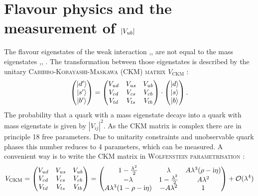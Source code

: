 \section{Flavour physics and the measurement of $|{V_{{u}{b}}}|$}
The flavour eigenstates of the weak interaction ,,   are not equal to the mass eigenstates \ket{\dquark},\ket{\squark},  \ket{\bquark}.
The transformation between those eigenstates is described by the unitary \textsc{Cabibbo-Kobayashi-Maskawa (CKM) matrix} $V_\text{CKM}$ \cite{Kobayashi_CKM}:
\begin{align}
\begin{pmatrix}
|d'\rangle \\ |s'\rangle \\ |b'\rangle
\end{pmatrix}
=
\begin{pmatrix}
V_{ud} & V_{us} & V_{ub} \\
V_{cd} & V_{cs} & V_{cb} \\
V_{td} & V_{ts} & V_{tb} \\
\end{pmatrix}
\cdot
\begin{pmatrix}
|d\rangle \\ |s\rangle \\ |b\rangle
\end{pmatrix}.
\end{align}
The probability that a quark with a mass eigenstate  decays into a quark with mass eigenstate  is given by $|V_{ij}|^2$.
As the CKM matrix is complex there are in principle 18 free parameters.
Due to unitarity constraints and unobservable quark phases this number reduces to 4 parameters, which can be measured.
A convenient way is to write the CKM matrix in \textsc{Wolfenstein parametrisation} \cite{Wolfenstein}:
\begin{align}
    V_{\text{CKM}}=
    \begin{pmatrix}
    V_{ud} & V_{us} & V_{ub} \\
    V_{cd} & V_{cs} & V_{cb} \\
    V_{td} & V_{ts} & V_{tb} \\
    \end{pmatrix}
    =
    \begin{pmatrix}
    1-\frac{\lambda^2}{2} & \lambda & A\lambda^3(\rho-\mathrm{i}\eta) \\
    -\lambda & 1-\frac{\lambda^2}{2} & A\lambda^2 \\
    A\lambda^3(1-\rho-\mathrm{i}\eta) & -A\lambda^2 & 1
    \end{pmatrix}
    + \mathcal{O}(\lambda^4)
\end{align}
